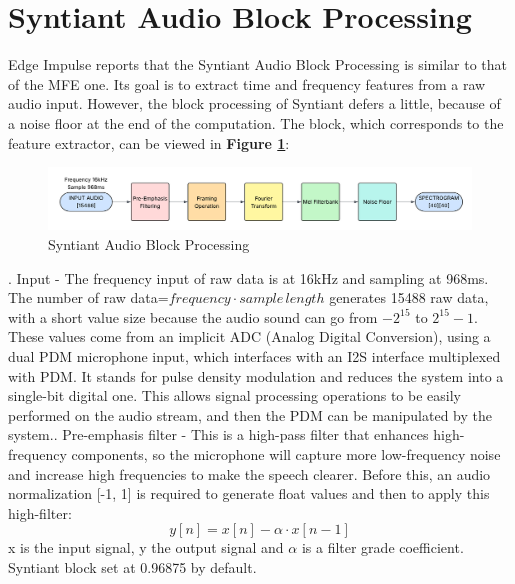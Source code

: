 \section{Syntiant Audio Block Processing}
\label{sec:audio}
Edge Impulse reports that the Syntiant Audio Block Processing is similar to that of the MFE one\cite{syntiant_audio_block}. Its goal is to extract time and frequency features from a raw audio input. However, the block processing of Syntiant defers a little, because of a noise floor at the end of the computation. The block, which corresponds to the feature extractor, can be viewed in \textbf{Figure \ref{fig:syntiant audio block}}\cite{audio_processing_theory}\cite{edgeimpulse_processing_blocks}:
\begin{figure}[!h]
    \centering
    \includegraphics[width=1.0\textwidth]{images/2.03 MFE Block Processing.png}
    \caption{Syntiant Audio Block Processing}
    \label{fig:syntiant audio block}
\end{figure}. Input - The frequency input of raw data is at 16kHz and sampling at 968ms. The number of raw data=$frequency\cdot sample\,length$ generates 15488 raw data, with a short value size because the audio sound can go from $-2^{15}$ to $2^{15}-1$. These values come from an implicit ADC (Analog Digital Conversion), using a dual PDM microphone input, which interfaces with an I2S interface multiplexed with PDM\cite{PDM_module}. It stands for pulse density modulation and reduces the system into a single-bit digital one. This allows signal processing operations to be easily performed on the audio stream, and then the PDM can be manipulated by the system.. Pre-emphasis filter - This is a high-pass filter that enhances high-frequency components, so the microphone will capture more low-frequency noise and increase high frequencies to make the speech clearer. Before this, an audio normalization [-1, 1] is required to generate float values and then to apply this high-filter:
\begin{equation}
    y[n]=x[n]-\alpha\cdot x[n-1]
\end{equation}
x is the input signal, y the output signal and $\alpha$ is a filter grade coefficient. Syntiant block set at 0.96875 by default.\newline
